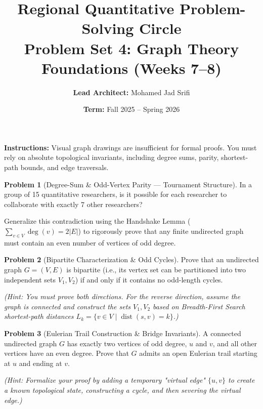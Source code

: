 \documentclass[11pt, a4paper]{article}
\theoremstyle{definition}
\newtheorem{problem}{Problem}
\theoremstyle{plain}
\begin{document}
\title{\vspace{-1.5cm}\textbf{Regional Quantitative Problem-Solving Circle} \\ \Large Problem Set 4: Graph Theory Foundations (Weeks 7--8)}
\author{\textbf{Lead Architect:} Mohamed Jad Srifi}
\date{\textbf{Term:} Fall 2025 -- Spring 2026}
\maketitle

\noindent\textbf{Instructions:} Visual graph drawings are insufficient for formal proofs. You must rely on absolute topological invariants, including degree sums, parity, shortest-path bounds, and edge traversals. 

\vspace{0.5cm}

\begin{problem}[Degree-Sum \& Odd-Vertex Parity --- Tournament Structure]
In a group of 15 quantitative researchers, is it possible for each researcher to collaborate with exactly 7 other researchers? 

Generalize this contradiction using the Handshake Lemma ($\sum_{v \in V} \deg(v) = 2|E|$) to rigorously prove that any finite undirected graph must contain an even number of vertices of odd degree.
\end{problem}

\vspace{0.5cm}

\begin{problem}[Bipartite Characterization \& Odd Cycles]
Prove that an undirected graph $G = (V, E)$ is bipartite (i.e., its vertex set can be partitioned into two independent sets $V_1, V_2$) if and only if it contains no odd-length cycles.

\textit{(Hint: You must prove both directions. For the reverse direction, assume the graph is connected and construct the sets $V_1, V_2$ based on Breadth-First Search shortest-path distances $L_k = \{v \in V \mid \operatorname{dist}(s, v) = k\}$.)}
\end{problem}

\vspace{0.5cm}

\begin{problem}[Eulerian Trail Construction \& Bridge Invariants]
A connected undirected graph $G$ has exactly two vertices of odd degree, $u$ and $v$, and all other vertices have an even degree. Prove that $G$ admits an open Eulerian trail starting at $u$ and ending at $v$.

\textit{(Hint: Formalize your proof by adding a temporary "virtual edge" $\{u, v\}$ to create a known topological state, constructing a cycle, and then severing the virtual edge.)}
\end{problem}
\end{document}
